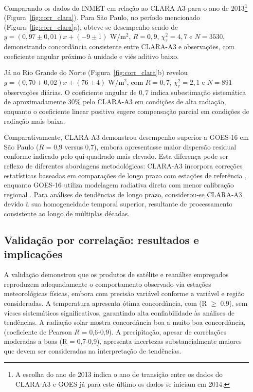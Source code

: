 Comparando os dados do INMET em relação ao CLARA-A3 para o ano de 2013\footnote{A escolha do ano de 2013 indica o ano de transição entre os dados do CLARA-A3 e GOES já para este último os dados se iniciam em 2014.} (Figura~\ref{fig:corr_clara}). Para São Paulo, no período mencionado (Figura~\ref{fig:corr_clara}a), obteve-se desempenho sendo de $y = (0{,}97 \pm 0{,}01)x + (-9 \pm 1)$ W/m$^2$, $R = 0{,}9$, $\chi^2_r = 4,7$ e $N = 3530$, demonstrando concordância consistente entre CLARA-A3 e observações, com coeficiente angular próximo à unidade e viés aditivo baixo.

Já no Rio Grande do Norte (Figura~\ref{fig:corr_clara}b) revelou $y = (0{,}70 \pm 0{,}02)x + (76 \pm 4)$ W/m$^2$, com $R = 0{,}7$, $\chi^2_r = 2,1$ e $N = 891$ observações diárias. O coeficiente angular de $0{,}7$ indica subestimação sistemática de aproximadamente 30\% pelo CLARA-A3 em condições de alta radiação, enquanto o coeficiente linear positivo sugere compensação parcial em condições de radiação mais baixa.

Comparativamente, CLARA-A3 demonstrou desempenho superior a GOES-16 em São Paulo ($R$ = 0{,}9 versus 0{,}7), embora apresentasse maior dispersão residual conforme indicado pelo qui-quadrado mais elevado. Esta diferença pode ser reflexo de diferentes abordagens metodológicas: CLARA-A3 incorpora correções estatísticas baseadas em comparações de longo prazo com estações de referência \citep{karlsson2023claraA3}, enquanto GOES-16 utiliza modelagem radiativa direta com menor calibração regional \citep{laszlo2020}. Para análises de tendências de longo prazo, considerou-se CLARA-A3 devido à sua homogeneidade temporal superior, resultante de processamento consistente ao longo de múltiplas décadas.

\subsection{Validação por correlação: resultados e implicações}

A validação demonstrou que os produtos de satélite e reanálise empregados reproduzem adequadamente o comportamento observado via estações meteorológicas físicas, embora com precisão variável conforme a variável e região consideradas. A temperatura apresenta ótima concordância, com (R $\ge$ 0{,}9), sem vieses sistemáticos significativos, garantindo alta confiabilidade às análises de tendências. A radiação solar mostra concordância boa a muito boa concordância, (coeficiente de Pearson $R$ = 0{,}6-0{,}9). A precipitação, apesar de correlações moderadas a boas (R = 0{,}7-0{,}9), apresenta incertezas substancialmente maiores que devem ser consideradas na interpretação de tendências.

